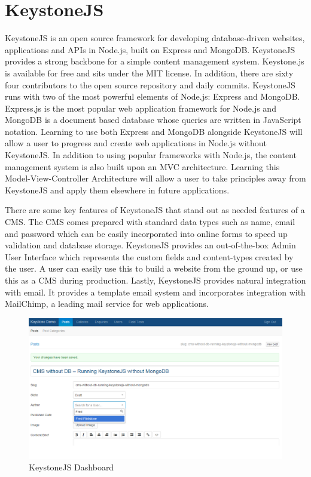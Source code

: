\section{KeystoneJS}
\label{sec:CMS_ksjs}

KeystoneJS is an open source framework for developing database-driven websites, applications and APIs in Node.js, built on Express and MongoDB.
KeystoneJS provides a strong backbone for a simple content management system. Keystone.js is available for free and sits under the MIT license. In addition, there are sixty four contributors to the open source repository and daily commits.
KeystoneJS runs with two of the most powerful elements of Node.js: Express and MongoDB. Express.js is the most popular web application framework for Node.js and MongoDB is a document based database whose queries are written in JavaScript notation. Learning to use both Express and MongoDB alongside KeystoneJS will allow a user to progress and create web applications in Node.js without KeystoneJS. In addition to using popular frameworks with Node.js, the content management system is also built upon an MVC architecture. Learning this Model-View-Controller Architecture will allow a user to take principles away from KeystoneJS and apply them elsewhere in future applications. \cite{cms_ksjs_rev}

There are some key features of KeystoneJS that stand out as needed features of a CMS. The CMS comes prepared with standard data types such as name, email and password which can be easily incorporated into online forms to speed up validation and database storage. KeystoneJS provides an out-of-the-box Admin User Interface which represents the custom fields and content-types created by the user. A user can easily use this to build a website from the ground up, or use this as a CMS during production. Lastly, KeystoneJS provides natural integration with email. It provides a template email system and incorporates integration with MailChimp, a leading mail service for web applications. \cite{cms_ksjs}



\begin {figure}[h]
\graphicspath{{images/chapter_cms/}}
\includegraphics[width=\textwidth]{ksjs_dash}
\caption{KeystoneJS Dashboard}
\end {figure}